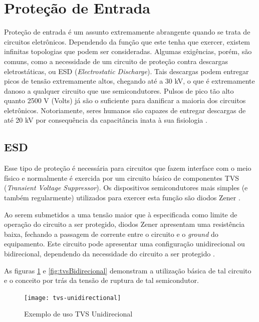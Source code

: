 \section{Proteção de Entrada}\label{sec:InputProtection}

Proteção de entrada é um assunto extremamente abrangente quando se trata de circuitos eletrônicos. Dependendo da função que este tenha que exercer, existem infinitas topologias que podem ser consideradas. Algumas exigências, porém, são comuns, como a necessidade de um circuito de proteção contra descargas eletrostáticas, ou \gls{ESD} (\textit{Electrostatic Discharge}). Tais descargas podem entregar picos de tensão extremamente altos, chegando até a 30 kV, o que é extremamente danoso a qualquer circuito que use semicondutores. Pulsos de pico tão alto quanto 2500 V (Volts) já são o suficiente para danificar a maioria dos circuitos eletrônicos. Notoriamente, seres humanos são capazes de entregar descargas de até 20 kV por consequência da capacitância inata à sua fisiologia \cite{ONsemicondTVS2}.

\subsection{ESD}\label{subsec:electrostaticDischarge}
Esse tipo de proteção é necessária para circuitos que fazem interface com o meio físico e normalmente é exercida por um circuito básico de componentes \gls{TVS} (\textit{Transient Voltage Suppressor}). Os dispositivos semicondutores mais simples (e também regularmente) utilizados para exercer esta função são diodos Zener \cite{IPblog}.

Ao serem submetidos a uma tensão maior que à especificada como limite de operação do circuito a ser protegido, diodos Zener apresentam uma resistência baixa, fechando a passagem de corrente entre o circuito e o \textit{ground} do equipamento. Este circuito pode apresentar uma configuração unidirecional ou bidirecional, dependendo da necessidade do circuito a ser protegido \cite{TIESD}.

As figuras \ref{fig:tvsUnidirecional} e \ref{fig:tvsBidirecional} demonstram a utilização básica de tal circuito e o conceito por trás da tensão de ruptura de tal semicondutor.

\begin{figure}[htb!]%
    \caption{Exemplo de uso TVS Unidirecional}%
    \label{fig:tvsUnidirecional}%
    \texttt{[image: tvs-unidirectional]}%
\end{figure}

